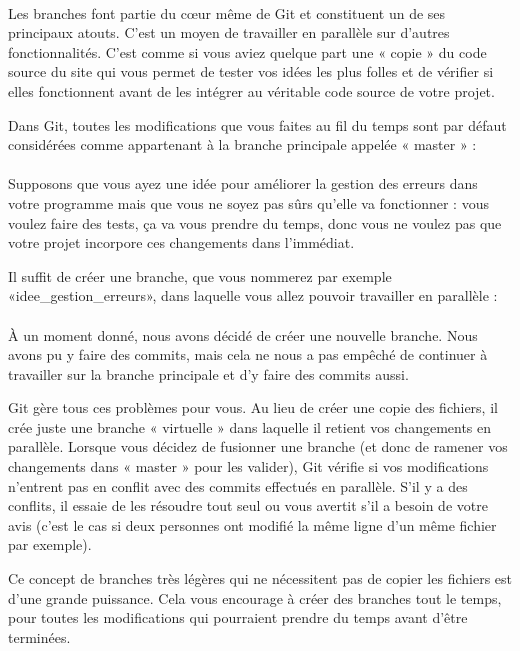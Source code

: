 \documentclass[french, a4paper, 12pt, titlepage]{article}
\begin{document}
\paragraph{}Les branches font partie du cœur même de Git et constituent un de ses principaux atouts. C’est un moyen de travailler en parallèle sur d’autres fonctionnalités. C’est comme si vous aviez quelque part une « copie » du code source du site qui vous permet de tester vos idées les plus folles et de vérifier si elles fonctionnent avant de les intégrer au véritable code source de votre projet.

Dans Git, toutes les modifications que vous faites au fil du temps sont par défaut considérées comme appartenant à la branche principale appelée « master » :


\paragraph{}Supposons que vous ayez une idée pour améliorer la gestion des erreurs dans votre programme mais que vous ne soyez pas sûrs qu’elle va fonctionner : vous voulez faire des tests, ça va vous prendre du temps, donc vous ne voulez pas que votre projet incorpore ces changements dans l’immédiat.

Il suffit de créer une branche, que vous nommerez par exemple «idee\_gestion\_erreurs», dans laquelle vous allez pouvoir travailler en parallèle :


\paragraph{}À un moment donné, nous avons décidé de créer une nouvelle branche. Nous avons pu y faire des commits, mais cela ne nous a pas empêché de continuer à travailler sur la branche principale et d’y faire des commits aussi.

Git gère tous ces problèmes pour vous. Au lieu de créer une copie des fichiers, il crée juste une branche « virtuelle » dans laquelle il retient vos changements en parallèle. Lorsque vous décidez de fusionner une branche (et donc de ramener vos changements dans « master » pour les valider), Git vérifie si vos modifications n’entrent pas en conflit avec des commits effectués en parallèle. S’il y a des conflits, il essaie de les résoudre tout seul ou vous avertit s’il a besoin de votre avis (c’est le cas si deux personnes ont modifié la même ligne d’un même fichier par exemple).

Ce concept de branches très légères qui ne nécessitent pas de copier les fichiers est d’une grande puissance. Cela vous encourage à créer des branches tout le temps, pour toutes les modifications qui pourraient prendre du temps avant d’être terminées.
\end{document}
